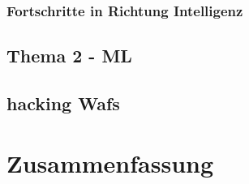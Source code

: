 
\subsubsection{Fortschritte in Richtung Intelligenz}


\subsection{Thema 2 - ML}


\subsection{hacking Wafs}


\section{Zusammenfassung}

